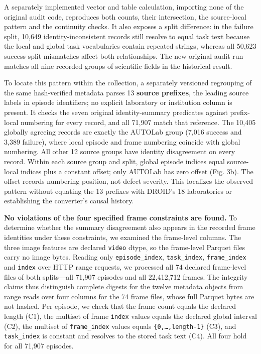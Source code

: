 \documentclass[conference]{IEEEtran}
\begin{document}
A separately implemented vector and table calculation, importing none of the original audit code, reproduces both counts, their intersection, the source-local pattern and the continuity checks. It also exposes a split difference: in the failure split, 10,649 identity-inconsistent records still resolve to equal task text because the local and global task vocabularies contain repeated strings, whereas all 50,623 success-split mismatches affect both relationships. The new original-audit run matches all nine recorded groups of scientific fields in the historical result.\par

To locate this pattern within the collection, a separately versioned regrouping of the same hash-verified metadata parses 13 \textbf{source prefixes}, the leading source labels in episode identifiers; no explicit laboratory or institution column is present. It checks the seven original identity-summary predicates against prefix-local numbering for every record, and all 71,907 match that reference. The 10,405 globally agreeing records are exactly the AUTOLab group (7,016 success and 3,389 failure), where local episode and frame numbering coincide with global numbering. All other 12 source groups have identity disagreement on every record. Within each source group and split, global episode indices equal source-local indices plus a constant offset; only AUTOLab has zero offset (Fig. 3b). The offset records numbering position, not defect severity. This localizes the observed pattern without equating the 13 prefixes with DROID's 18 laboratories or establishing the converter's causal history.\par

\textbf{No violations of the four specified frame constraints are found.} To determine whether the summary disagreement also appears in the recorded frame identities under these constraints, we examined the frame-level columns. The three image features are declared \texttt{video} dtype, so the frame-level Parquet files carry no image bytes. Reading only \texttt{episode\_\allowbreak{}\allowbreak{}index}, \texttt{task\_\allowbreak{}\allowbreak{}index}, \texttt{frame\_\allowbreak{}\allowbreak{}index} and \texttt{index} over HTTP range requests, we processed all 74 declared frame-level files of both splits---all 71,907 episodes and all 22,412,712 frames. The integrity claims thus distinguish complete digests for the twelve metadata objects from range reads over four columns for the 74 frame files, whose full Parquet bytes are not hashed. Per episode, we check that the frame count equals the declared length (C1), the multiset of frame \texttt{index} values equals the declared global interval (C2), the multiset of \texttt{frame\_\allowbreak{}\allowbreak{}index} values equals \texttt{\{0,…,length-1\}} (C3), and \texttt{task\_\allowbreak{}\allowbreak{}index} is constant and resolves to the stored task text (C4). All four hold for all 71,907 episodes.\par
\end{document}
